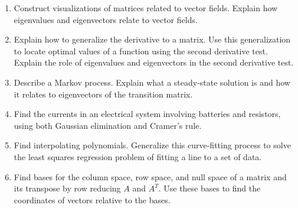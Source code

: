 \begin{enumerate}

\item Construct visualizations of matrices related to vector fields. Explain how eigenvalues and eigenvectors relate to vector fields.
\item Explain how to generalize the derivative to a matrix. Use this
  generalization to locate optimal values of a function using the second derivative test. Explain the role of eigenvalues and eigenvectors in the second derivative test.
\item Describe a Markov process. Explain what a steady-state solution is and how it relates to eigenvectors of the transition matrix.
\item Find the currents in an electrical system involving batteries and resistors, using both Gaussian elimination and Cramer's rule.
\item Find interpolating polynomials. Generalize this curve-fitting process to solve the least squares regression problem of fitting a line to a set of data.
\item Find bases for the column space, row space, and null space of a matrix and its transpose by row reducing $A$ and $A^T$. Use these bases to find the coordinates of vectors relative to the bases.

\end{enumerate}



